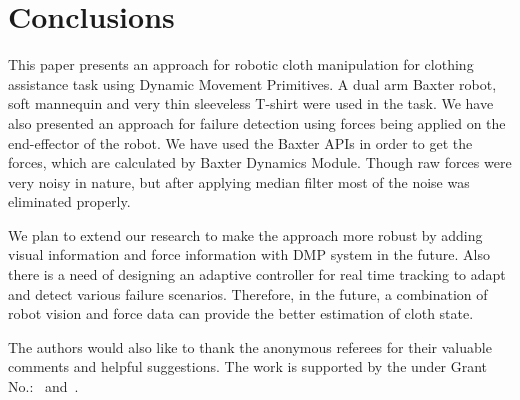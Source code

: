 \documentclass[sigconf]{acmart}
\begin{document}
\section{Conclusions}
\label{sec:conclusions}
This paper presents an approach for robotic cloth manipulation for clothing assistance task using Dynamic Movement Primitives. A dual arm Baxter robot, soft mannequin and very thin sleeveless T-shirt were used in the task. We have also presented an approach for failure detection using forces being applied on the end-effector of the robot. We have used the Baxter APIs in order to get the forces, which are calculated by Baxter Dynamics Module. Though raw forces were very noisy in nature, but after applying median filter most of the noise was eliminated properly.

We plan to extend our research to make the approach more robust by adding visual information and force information with DMP system in the future. Also there is a need of designing an adaptive controller for real time tracking to adapt and detect various failure scenarios. Therefore, in the future, a combination of robot vision and force data can provide the better estimation of cloth state.

\begin{acks}
	The authors would also like to thank the anonymous referees for their valuable comments and helpful suggestions. The work is supported by the  under Grant No.:~ and~.
\end{acks}


%

\end{document}

